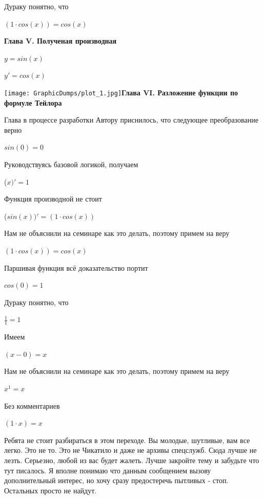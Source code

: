 \documentclass[12pt,a4paper,fleqn]{article}
\begin{document}
Дураку понятно, что

\begin{center}
$(1 \cdot cos(x)) = cos(x)$\end{center}
\newpage \textbf{\LARGE{Глава V. Полученая производная}}

$y = $$sin(x)$

$y' = $$cos(x)$

\texttt{[image: GraphicDumps/plot\_1.jpg]}\newpage \textbf{\LARGE{Глава VI. Разложение функции по формуле Тейлора}}

Глава в процессе разработки
Автору приснилось, что следующее преобразование верно

\begin{center}
\begin{center}$sin(0) = 0$\end{center}
Руководствуясь базовой логикой, получаем

\begin{center}
 ($x)'
  = 1$\end{center}
Функция производной не стоит\cite{link2}

\begin{center}
 ($sin(x))'
  = (1 \cdot cos(x))$\end{center}
Нам не объяснили на семинаре как это делать, поэтому примем на веру

\begin{center}
$(1 \cdot cos(x)) = cos(x)$\end{center}
Паршивая функция всё доказательство портит\cite{link2}

\begin{center}
\begin{center}$cos(0) = 1$\end{center}
Дураку понятно, что

\begin{center}
\begin{center}$\frac{1}{1} = 1$\end{center}
Имеем

\begin{center}
$(x-0) = x$\end{center}
Нам не объяснили на семинаре как это делать, поэтому примем на веру

\begin{center}
$x^{1} = x$\end{center}
Без комментариев\cite{link4}

\begin{center}
$(1 \cdot x) = x$\end{center}
Ребята не стоит разбираться в этом переходе. Вы молодые, шутливые, вам все легко. Это не то. Это не Чикатило и даже не архивы спецслужб. Сюда лучше не лезть. Серьезно, любой из вас будет жалеть. Лучше закройте тему и забудьте что тут писалось. Я вполне понимаю что данным сообщением вызову дополнительный интерес, но хочу сразу предостеречь пытливых - стоп. Остальных просто не найдут.


\end{center}
\end{center}
\end{center}
\end{document}
